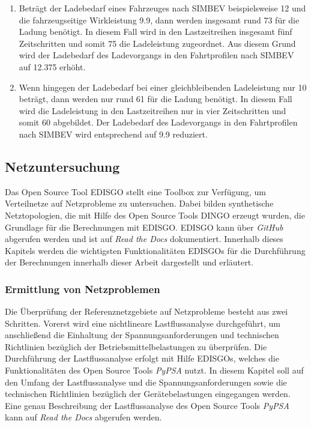 \begin{enumerate}
	\item Beträgt der Ladebedarf eines Fahrzeuges nach \gls{SIMBEV} beispielsweise \SI{12}{\kwh} und die fahrzeugseitige Wirkleistung \SI{9.9}{\kw}, dann werden insgesamt rund \SI{73}{\Minuten} für die Ladung benötigt. In diesem Fall wird in den Lastzeitreihen insgesamt fünf Zeitschritten und somit \SI{75}{\Minuten} die Ladeleistung zugeordnet. Aus diesem Grund wird der Ladebedarf des Ladevorgangs in den Fahrtprofilen nach \gls{SIMBEV} auf \SI{12.375}{\kwh} erhöht.
	\item Wenn hingegen der Ladebedarf bei einer gleichbleibenden Ladeleistung nur \SI{10}{\kwh} beträgt, dann werden nur rund \SI{61}{\Minuten} für die Ladung benötigt. In diesem Fall wird die Ladeleistung in den Lastzeitreihen nur in vier Zeitschritten und somit \SI{60}{\Minuten} abgebildet. Der Ladebedarf des Ladevorgangs in den Fahrtprofilen nach \gls{SIMBEV} wird entsprechend auf \SI{9.9}{\kwh} reduziert.
\end{enumerate}


\subsection{Netzuntersuchung}\label{chap:edisgo_theo}

Das Open Source Tool \gls{EDISGO} stellt eine Toolbox zur Verfügung, um Verteilnetze auf Netzprobleme zu untersuchen.
Dabei bilden synthetische Netztopologien, die mit Hilfe des Open Source Tools \gls{DINGO} erzeugt wurden, die Grundlage für die Berechnungen mit \gls{EDISGO}.
\gls{EDISGO} kann über \textit{GitHub} \cite{edisgoGit2019} abgerufen werden und ist auf \textit{Read the Docs} \cite{edisgoDocs2017} dokumentiert.
Innerhalb dieses Kapitels werden die wichtigsten Funktionalitäten \glspl{EDISGO} für die Durchführung der Berechnungen innerhalb dieser Arbeit dargestellt und erläutert.


\subsubsection{Ermittlung von Netzproblemen}\label{chap:grid_issues}

Die Überprüfung der Referenznetzgebiete auf Netzprobleme besteht aus zwei Schritten.
Vorerst wird eine nichtlineare Lastflussanalyse durchgeführt, um anschließend die Einhaltung der Spannungsanforderungen und technischen Richtlinien bezüglich der Betriebsmittelbelastungen zu überprüfen.
Die Durchführung der Lastflussanalyse erfolgt mit Hilfe \glspl{EDISGO}, welches die Funktionalitäten des Open Source Tools \textit{PyPSA} \cite{Brown2020} nutzt.
In diesem Kapitel soll auf den Umfang der Lastflussanalyse und die Spannungsanforderungen sowie die technischen Richtlinien bezüglich der Gerätebelastungen eingegangen werden.
Eine genau Beschreibung der Lastflussanalyse des Open Source Tools \textit{PyPSA} kann auf \textit{Read the Docs} \cite{Brown2020a} abgerufen werden.\medskip

